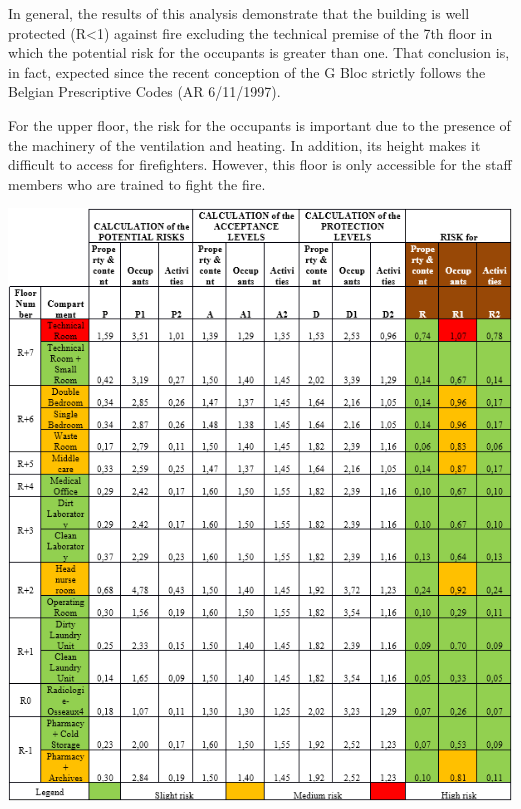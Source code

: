 \documentclass{style/llncs}
\begin{document}
In general, the results of this analysis demonstrate that the building is
well protected (R\textless{}1) against fire excluding the technical premise of
the 7th floor in which the potential risk for the occupants is greater
than one. That conclusion is, in fact, expected since the recent
conception of the G Bloc strictly follows the Belgian Prescriptive Codes
(AR 6/11/1997).%

For the upper floor, the risk for the occupants is important due to the
presence of the machinery of the ventilation and heating. In addition,
its height makes it difficult to access for firefighters. However, this
floor is only accessible for the staff members who are trained to fight
the fire.%

\begin{table}[tbp]%
\begin{mdcenter}%

\noindent{}\includegraphics[keepaspectratio=true,width=\dimmin{}{\dimwidth{1.00}}]{images/TAB_FRAME}{}%

\mdhr{}%

\noindent{}%
\end{mdcenter}\label{tab-frame}%
\end{table}%
\end{document}
